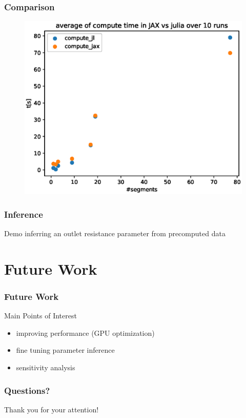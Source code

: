 \documentclass{beamer}
\begin{document}
\begin{frame}
	\frametitle{Comparison}
	\begin{figure} [H]
		\centering
		\includegraphics[width=0.94\columnwidth]{images/comparison.eps}
		\label{fig:comparison}
	\end{figure}

\end{frame}
\begin{frame}
	\frametitle{Inference}
	\begin{block}{Demo}
		inferring an outlet resistance parameter from precomputed data
	\end{block}
\end{frame}

\section{Future Work}
\begin{frame}
	\frametitle{Future Work}
	\begin{block}{Main Points of Interest}
		\begin{itemize}
			\item improving performance (GPU optimization)
			\item fine tuning parameter inference
			\item sensitivity analysis
		\end{itemize}
	\end{block}
	\vspace{5mm}
\end{frame}

\begin{frame}
	\frametitle{Questions?}
	Thank you for your attention!
\end{frame}
\end{document}
